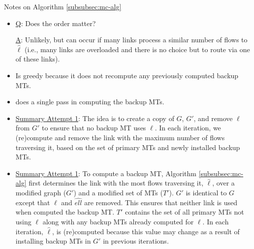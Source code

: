 Notes on Algorithm \ref{subsubsec:mc-alg} %
\begin{itemize}

	\item \underline{Q}: Does the order matter? 
	
	\underline{A}: Unlikely, but can occur if many links process a similar number of flows to $\hat{\ell}$ (i.e., many links are overloaded
	and there is no choice but to route via one of these links).

	\item Is greedy because it does not recompute any previously computed backup MTs.  

	\item does a single pass in computing the backup MTs.

	\item \underline{Summary Attempt 1}: The idea is to create a copy of $G$, $G'$, and remove $\ell$ from $G'$ to ensure that no backup MT uses $\ell$.  In each iteration, we (re)compute and 
	remove the link with the maximum number of flows traversing it, based on the set of primary MTs and newly installed backup MTs.


	\item \underline{Summary Attempt 1}: To compute a backup MT, Algorithm \ref{subsubsec:mc-alg} first determines the
	link with the most flows traversing it, $\hat{\ell}$, over a modified graph ($G'$) and a modified set of MTs ($T'$).  $G'$ is identical to $G$ except that  $\ell$ and $\hat{ell}$ 
	are removed.  This ensures that neither link is used when computed the backup MT. $T'$ contains the set of all primary MTs not using $\ell$ along with any backup MTs already computed for $\ell$.  
	In each iteration,  $\hat{\ell}$, is (re)computed because this value may change as a result of installing backup MTs in $G'$ in previous iterations. 

\end{itemize}



















